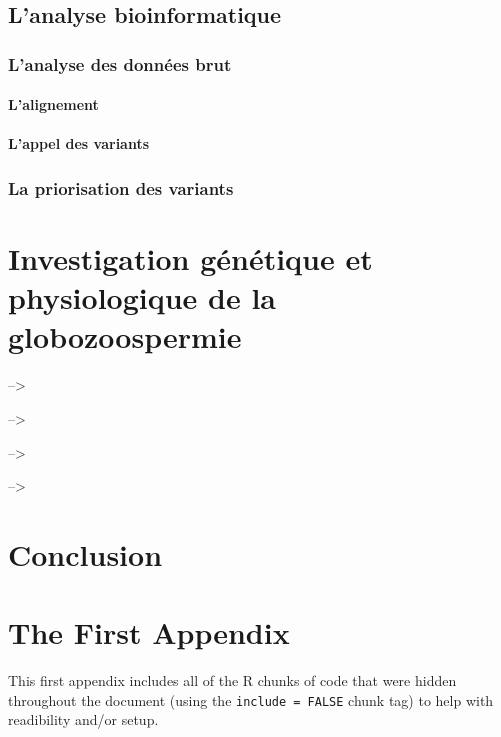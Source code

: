 \documentclass[12pt,twoside]{reedthesis}
\theoremstyle{definition}
\theoremstyle{definition}
\theoremstyle{remark}
\begin{document}
  \section{L'analyse bioinformatique}\label{lanalyse-bioinformatique}
  
  \subsection{L'analyse des données brut}\label{lanalyse-des-donnees-brut}
  
  \subsubsection{L'alignement}\label{lalignement}
  
  \subsubsection{L'appel des variants}\label{lappel-des-variants}
  
  \subsection{La priorisation des
  variants}\label{la-priorisation-des-variants}
  
  \chapter{Investigation génétique et physiologique de la
  globozoospermie}\label{globo}
  
  --\textgreater{}
  
  --\textgreater{}
  
  --\textgreater{}
  
  --\textgreater{}
  
  \chapter*{Conclusion}\label{conclusion}
  
  \appendix
  
  \chapter{The First Appendix}\label{the-first-appendix}
  
  This first appendix includes all of the R chunks of code that were
  hidden throughout the document (using the \texttt{include\ =\ FALSE}
  chunk tag) to help with readibility and/or setup.
  
\end{document}
